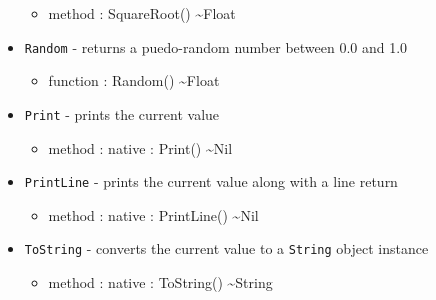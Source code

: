 \documentclass[11pt]{article}
\begin{document}
\begin{itemize}
  \begin{itemize}
  \item method : SquareRoot() \textasciitilde Float
  \end{itemize}
\item \texttt{Random} - returns a puedo-random number between 0.0 and
  1.0
  \begin{itemize}
  \item function : Random() \textasciitilde Float
  \end{itemize}
\item \texttt{Print} - prints the current value
  \begin{itemize}
  \item method : native : Print() \textasciitilde Nil
  \end{itemize}
\item \texttt{PrintLine} - prints the current value along with a line
  return
  \begin{itemize}
  \item method : native : PrintLine() \textasciitilde Nil
  \end{itemize}
\item \texttt{ToString} - converts the current value to a
  \texttt{String} object instance
  \begin{itemize}
  \item method : native : ToString() \textasciitilde String
  \end{itemize}
\end{itemize}
\end{document}
